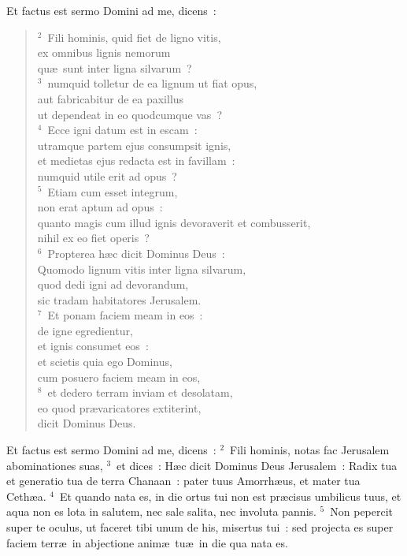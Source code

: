 \bchapter
\lettrine[lines=3,image=true,loversize=0.05,lraise=-0.03]{E}{}t factus est sermo Domini ad me, dicens~:
\begin{flushleft}\begin{verse}\vspace{6pt}${}^{2}$~Fili hominis, quid fiet de ligno vitis,\\ ex omnibus lignis nemorum\\ qu\ae\ sunt inter ligna silvarum~?\\
${}^{3}$~numquid tolletur de ea lignum ut fiat opus,\\ aut fabricabitur de ea paxillus\\ ut dependeat in eo quodcumque vas~?\\
${}^{4}$~Ecce igni datum est in escam~:\\ utramque partem ejus consumpsit ignis,\\ et medietas ejus redacta est in favillam~:\\ numquid utile erit ad opus~?\\
${}^{5}$~Etiam cum esset integrum,\\ non erat aptum ad opus~:\\ quanto magis cum illud ignis devoraverit et combusserit,\\ nihil ex eo fiet operis~?\\
${}^{6}$~Propterea h\ae c dicit Dominus Deus~:\\ Quomodo lignum vitis inter ligna silvarum,\\ quod dedi igni ad devorandum,\\ sic tradam habitatores Jerusalem.\\
${}^{7}$~Et ponam faciem meam in eos~:\\ de igne egredientur,\\ et ignis consumet eos~:\\ et scietis quia ego Dominus,\\ cum posuero faciem meam in eos,\\
${}^{8}$~et dedero terram inviam et desolatam,\\ eo quod pr\ae varicatores extiterint,\\ dicit Dominus Deus.\end{verse}\end{flushleft}



\bchapter
\lettrine[lines=3,image=true,loversize=0.05,lraise=-0.03]{E}{}t factus est sermo Domini ad me, dicens~:
${}^{2}$~Fili hominis, notas fac Jerusalem abominationes suas,
${}^{3}$~et dices~: H\ae c dicit Dominus Deus Jerusalem~: Radix tua et generatio tua de terra Chanaan~: pater tuus Amorrh\ae us, et mater tua Ceth\ae a.
${}^{4}$~Et quando nata es, in die ortus tui non est pr\ae cisus umbilicus tuus, et aqua non es lota in salutem, nec sale salita, nec involuta pannis.
${}^{5}$~Non pepercit super te oculus, ut faceret tibi unum de his, misertus tui~: sed projecta es super faciem terr\ae\ in abjectione anim\ae\ tu\ae\ in die qua nata es.


